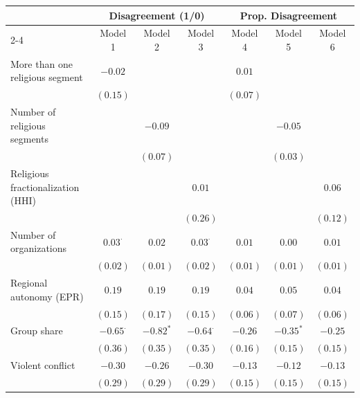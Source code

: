 
\begin{tabular}{l c c c c c c}
\hline
 & \multicolumn{3}{c}{Disagreement (1/0)} & \multicolumn{3}{c}{Prop. Disagreement} \\
\cline{2-4} \cline{5-7}
 & Model 1 & Model 2 & Model 3 & Model 4 & Model 5 & Model 6 \\
\hline
More than one religious segment   & $-0.02$         &             &                 & $0.01$   &             &          \\
                                  & $(0.15)$        &             &                 & $(0.07)$ &             &          \\
Number of religious segments      &                 & $-0.09$     &                 &          & $-0.05$     &          \\
                                  &                 & $(0.07)$    &                 &          & $(0.03)$    &          \\
Religious fractionalization (HHI) &                 &             & $0.01$          &          &             & $0.06$   \\
                                  &                 &             & $(0.26)$        &          &             & $(0.12)$ \\
Number of organizations           & $0.03^{\cdot}$  & $0.02$      & $0.03^{\cdot}$  & $0.01$   & $0.00$      & $0.01$   \\
                                  & $(0.02)$        & $(0.01)$    & $(0.02)$        & $(0.01)$ & $(0.01)$    & $(0.01)$ \\
Regional autonomy (EPR)           & $0.19$          & $0.19$      & $0.19$          & $0.04$   & $0.05$      & $0.04$   \\
                                  & $(0.15)$        & $(0.17)$    & $(0.15)$        & $(0.06)$ & $(0.07)$    & $(0.06)$ \\
Group share                       & $-0.65^{\cdot}$ & $-0.82^{*}$ & $-0.64^{\cdot}$ & $-0.26$  & $-0.35^{*}$ & $-0.25$  \\
                                  & $(0.36)$        & $(0.35)$    & $(0.35)$        & $(0.16)$ & $(0.15)$    & $(0.15)$ \\
Violent conflict                  & $-0.30$         & $-0.26$     & $-0.30$         & $-0.13$  & $-0.12$     & $-0.13$  \\
                                  & $(0.29)$        & $(0.29)$    & $(0.29)$        & $(0.15)$ & $(0.15)$    & $(0.15)$ \\

\end{tabular}
